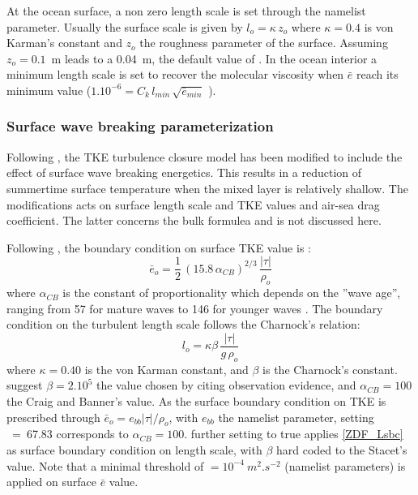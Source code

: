 At the ocean surface, a non zero length scale is set through the   namelist 
parameter. Usually the surface scale is given by $l_o = \kappa \,z_o$ 
where $\kappa = 0.4$ is von Karman's constant and $z_o$ the roughness 
parameter of the surface. Assuming $z_o=0.1$~m \citep{Craig_Banner_JPO94} 
leads to a 0.04~m, the default value of . In the ocean interior 
a minimum length scale is set to recover the molecular viscosity when $\bar{e}$ 
reach its minimum value ($1.10^{-6}= C_k\, l_{min} \,\sqrt{\bar{e}_{min}}$ ).


\subsubsection{Surface wave breaking parameterization}
Following \citet{Mellor_Blumberg_JPO04}, the TKE turbulence closure model has been modified 
to include the effect of surface wave breaking energetics. This results in a reduction of summertime 
surface temperature when the mixed layer is relatively shallow. The \citet{Mellor_Blumberg_JPO04} 
modifications acts on surface length scale and TKE values and air-sea drag coefficient. 
The latter concerns the bulk formulea and is not discussed here. 

Following \citet{Craig_Banner_JPO94}, the boundary condition on surface TKE value is :
\begin{equation}  \label{ZDF_Esbc}
\bar{e}_o = \frac{1}{2}\,\left(  15.8\,\alpha_{CB} \right)^{2/3} \,\frac{|\tau|}{\rho_o}
\end{equation}
where $\alpha_{CB}$ is the \citet{Craig_Banner_JPO94} constant of proportionality 
which depends on the ''wave age'', ranging from 57 for mature waves to 146 for 
younger waves \citep{Mellor_Blumberg_JPO04}. 
The boundary condition on the turbulent length scale follows the Charnock's relation:
\begin{equation} \label{ZDF_Lsbc}
l_o = \kappa \beta \,\frac{|\tau|}{g\,\rho_o}
\end{equation}
where $\kappa=0.40$ is the von Karman constant, and $\beta$ is the Charnock's constant.
\citet{Mellor_Blumberg_JPO04} suggest $\beta = 2.10^{5}$ the value chosen by \citet{Stacey_JPO99}
citing observation evidence, and $\alpha_{CB} = 100$ the Craig and Banner's value.
As the surface boundary condition on TKE is prescribed through $\bar{e}_o = e_{bb} |\tau| / \rho_o$, 
with $e_{bb}$ the  namelist parameter, setting ~=~67.83 corresponds 
to $\alpha_{CB} = 100$. further setting   to true applies \eqref{ZDF_Lsbc} 
as surface boundary condition on length scale, with $\beta$ hard coded to the Stacet's value.
Note that a minimal threshold of $=10^{-4}~m^2.s^{-2}$ (namelist parameters) 
is applied on surface $\bar{e}$ value.


